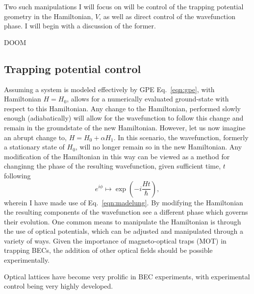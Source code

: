 Two such manipulations I will focus on will be control of the trapping potential geometry in the Hamiltonian, $V$, as well as direct control of the wavefunction phase. I will begin with a discussion of the former.

\newenvironment{myfont}{\selectfont}{\par}
\begin{myfont}
    DOOM
\end{myfont}

\subsection{Trapping potential control}

Assuming a system is modeled effectively by GPE Eq.~\ref{eqn:gpe}, with Hamiltonian $H = H_0$, allows for a numerically evaluated ground-state with respect to this Hamiltonian. Any change to the Hamiltonian, performed slowly enough (adiabatically) will allow for the wavefunction to follow this change and remain in the groundstate of the new Hamiltonian. However, let us now imagine an abrupt change to, $H = H_0 + \alpha H_1$. In this scenario, the wavefunction, formerly a stationary state of $H_0$, will no longer remain so in the new Hamiltonian. Any modification of the Hamiltonian in this way can be viewed as a method for changinng the phase of the resulting wavefunction, given sufficient time, $t$ following
\begin{equation}
    e^{i\phi} \mapsto \exp\left(-i\frac{Ht}{\hbar}\right),
\end{equation}
wherein I have made use of Eq.~\ref{eqn:madelung}. By modifying the Hamiltonian the resulting components of the wavefunction see a different phase which governs their evolution. One common means to manipulate the Hamiltonian is through the use of optical potentials, which can be adjusted and manipulated through a variety of ways. Given the importance of magneto-optical traps (MOT) in trapping BECs, the addition of other optical fields should be possible experimentally.

Optical lattices have become very prolific in BEC experiments, with experimental control being very highly developed.

